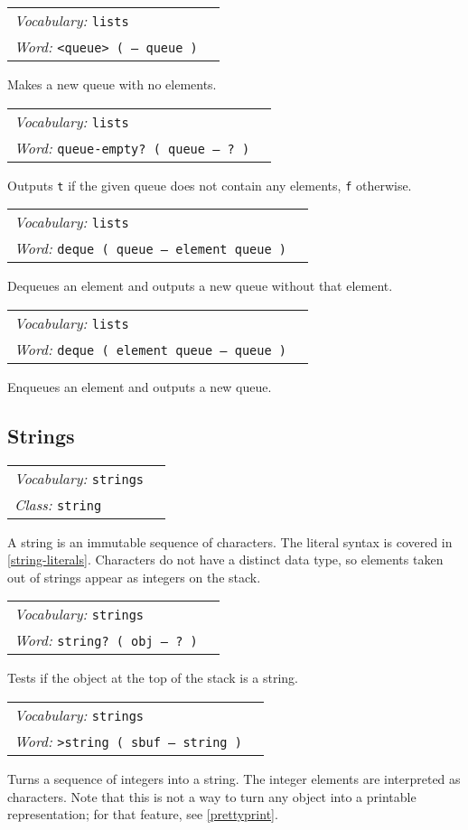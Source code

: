 \documentclass{book}
\newcommand{\vocabulary}[1]{\emph{Vocabulary:} \texttt{#1}&\\}
\newcommand{\ordinaryword}[2]{\index{\texttt{#1}}\emph{Word:} \texttt{#2}&\\}
\newcommand{\classword}[1]{\index{\texttt{#1}}\emph{Class:} \texttt{#1}&\\}
\newcommand{\wordtable}[1]{


\begin{tabularx}{12cm}{lX}
\hline
#1
\hline
\end{tabularx}

}
\begin{document}
\wordtable{
\vocabulary{lists}
\ordinaryword{<queue>}{<queue> ( -- queue )}
}
Makes a new queue with no elements.
\wordtable{
\vocabulary{lists}
\ordinaryword{queue-empty?}{queue-empty? ( queue -- ?~)}
}
Outputs \texttt{t} if the given queue does not contain any elements, \texttt{f} otherwise.
\wordtable{
\vocabulary{lists}
\ordinaryword{deque}{deque ( queue -- element queue )}
}
Dequeues an element and outputs a new queue without that element.
\wordtable{
\vocabulary{lists}
\ordinaryword{enque}{deque ( element queue -- queue )}
}
Enqueues an element and outputs a new queue.

\subsection{Strings}\label{strings}

\stringglos
\wordtable{
\vocabulary{strings}
\classword{string}
}
A string is an immutable sequence of characters. The literal syntax is covered in \ref{string-literals}. Characters do not have a distinct data type, so elements taken out of strings appear as integers on the stack.

\wordtable{
\vocabulary{strings}
\ordinaryword{string?}{string?~( obj -- ?~)}

}
Tests if the object at the top of the stack is a string.

\wordtable{
\vocabulary{strings}
\ordinaryword{>string}{>string~( sbuf -- string )}
}
Turns a sequence of integers into a string. The integer elements are interpreted as characters. Note that this is not a way to turn any object into a printable representation; for that feature, see \ref{prettyprint}.
\end{document}
